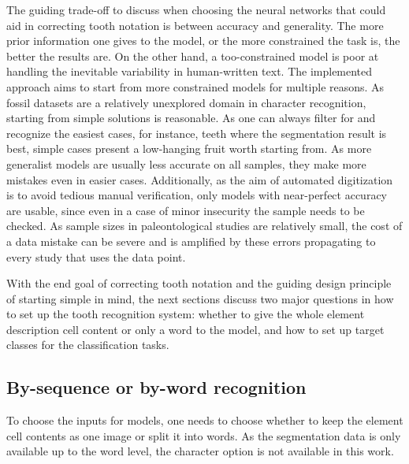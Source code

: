 \documentclass[english,twoside,openright]{UH_DS_MSc}
\begin{document}
The guiding trade-off to discuss when choosing the neural networks that could aid in correcting
tooth notation is between accuracy and generality. The more prior information one gives to 
the model, or the more constrained the task is, the better the results are. On the other hand, a too-constrained model is poor at handling the inevitable variability in human-written text.
The implemented approach aims to start from more constrained models for multiple reasons. 
As fossil datasets are a relatively unexplored domain in character recognition, starting from simple
solutions is reasonable. As one can always filter for and recognize the easiest 
cases, for instance, teeth where the segmentation result is best,
simple cases present a low-hanging fruit worth starting from. As more generalist 
models are usually less accurate on all samples, they make more mistakes even in
easier cases. Additionally, as the aim of automated digitization is to avoid tedious manual verification,
 only models with near-perfect accuracy are usable, since even in a case of minor insecurity the sample needs to be checked.
As sample sizes in paleontological studies are relatively small, the cost of a data mistake
can be severe and is amplified by these errors propagating to every study that uses the data point.

With the end goal of correcting tooth notation and the guiding design principle of starting simple in mind, the next sections discuss two major questions 
in how to set up the tooth recognition system: whether to give the whole element description cell content
 or only a word to the model, and how to set up target classes for the classification tasks.

\subsection{By-sequence or by-word recognition}

To choose the inputs for models, one needs to choose whether to keep the
element cell contents as one image or split it into words. As the segmentation 
data is only available up to the word level, the character option is not available in this work.
\end{document}
